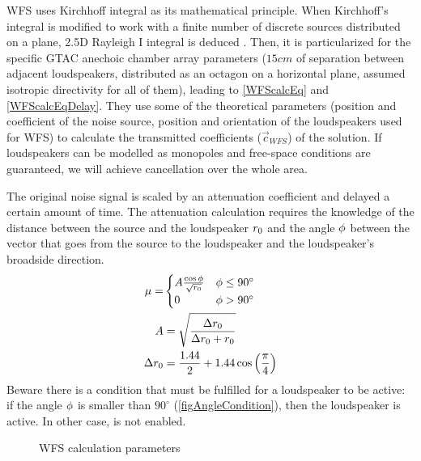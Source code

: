 WFS uses Kirchhoff integral as its mathematical principle. When Kirchhoff's integral is modified to work with a finite number of discrete sources distributed on a plane, 2.5D Rayleigh I integral is deduced \cite{Start1997}. Then, it is particularized for the specific GTAC anechoic chamber array parameters ($15 \si{cm}$ of separation between adjacent loudspeakers, distributed as an octagon on a horizontal plane, assumed isotropic directivity for all of them), leading to \autoref{WFScalcEq} and \autoref{WFScalcEqDelay}. They use some of the theoretical parameters (position and coefficient of the noise source, position and orientation of the loudspeakers used for WFS) to calculate the transmitted coefficients ($\vec{c}_\mathit{WFS}$) of the solution. If loudspeakers can be modelled as monopoles and free-space conditions are guaranteed, we will achieve cancellation over the whole area. 

The original noise signal is scaled by an attenuation coefficient and delayed a certain amount of time. The attenuation calculation requires the knowledge of the distance between the source and the loudspeaker $r_0$ and the angle $\phi$ between the vector that goes from the source to the loudspeaker and the loudspeaker's broadside direction.
\begin{equation}
	\begin{aligned}
		\mu = 
		&\begin{cases}
		A\frac{\cos\phi}{\sqrt{r_0}} & \phi \leq 90^\circ \\
		0 & \phi > 90^\circ
		\end{cases}
		\\
		A &= \sqrt{\frac{\Delta r_0}{\Delta r_0 + r_0}}\\
		\Delta r_0 &= \frac{1.44}{2} + 1.44 \cos\left( \frac{\pi}{4} \right)
	\end{aligned}
	\label{WFScalcEq}
\end{equation}
Beware there is a condition that must be fulfilled for a loudspeaker to be active: if the angle $\phi$ is smaller than $90^\circ$ (\autoref{figAngleCondition}), then the loudspeaker is active. In other case, is not enabled.

%	
\begin{figure}
	\centering
	\def\svgwidth{0.4\columnwidth}
	\graphicspath{{Img/}}
	
	\caption[WFS calculation parameters]{WFS calculation parameters}
	\label{figAngleCondition}
\end{figure}

